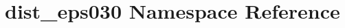 \hypertarget{namespacedist__eps030}{}\section{dist\+\_\+eps030 Namespace Reference}
\label{namespacedist__eps030}
